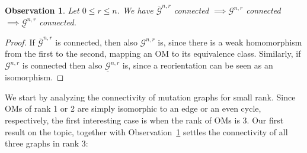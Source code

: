 \documentclass[final,11pt]{article}
\newtheorem{obs}[thm]{Observation}
\begin{document}
\begin{obs}\label{obs:connectivities}
 Let $0\leq r\leq n$. We have $\overline{\mathcal{G}}^{n,r}$ connected $\implies \mathcal{G}^{n,r}$ connected $\implies \underline{\mathcal{G}}^{n,r}$ connected. 
\end{obs}
\begin{proof}
 If $\overline{\mathcal{G}}^{n,r}$ is connected, then also $\mathcal{G}^{n,r}$ is, since there is a weak homomorphism from the first to the second, mapping an OM to its equivalence class. Similarly, if $\mathcal{G}^{n,r}$ is connected then also  $\underline{\mathcal{G}}^{n,r}$ is, since a reorientation can be seen as an isomorphism. 
\end{proof}


We start by analyzing the connectivity of mutation graphs for small rank. Since OMs of rank 1 or 2 are simply isomorphic to an edge or an even cycle, respectively, the first interesting case is when the rank of OMs is 3.
Our first result on the topic, together with Observation~\ref{obs:connectivities} settles the connectivity of all three graphs in rank $3$: 
\end{document}
